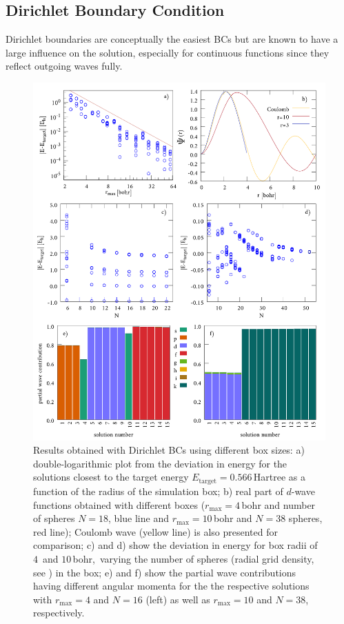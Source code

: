 \subsection{Dirichlet Boundary Condition}
\label{sec:DBCbench}
Dirichlet boundaries are conceptually the easiest BCs but are known to have a large influence on the solution, especially for continuous functions since they reflect outgoing waves fully.
\begin{figure}
\includegraphics[width=\textwidth]{Figures/BC/DirichletBC}
\caption{Results obtained with Dirichlet BCs using different box sizes:
a) double-logarithmic plot from the deviation in energy for the solutions closest to the target energy $E_\text{target}=0.566\,$Hartree as a function of the radius of the simulation box;
b) real part of $d$-wave functions obtained with different boxes ($r_\text{max}=4\,$bohr and number of spheres $N=18$, blue line and $r_\text{max}=10\,$bohr and $N=38$ spheres, red line); Coulomb wave (yellow line) is also presented for comparison;
c) and d) show the deviation in energy for box radii of $4\,$ and $10\,$bohr,\ varying the number of spheres (radial grid density, see ) in the box;
e) and f) show the partial wave contributions  having different angular momenta for the the respective solutions with $r_\text{max}=4$ and $N=16$ (left) as well as $r_\text{max}=10$ and $N=38$, respectively.}
\label{fig:dbcRad}
\end{figure}
